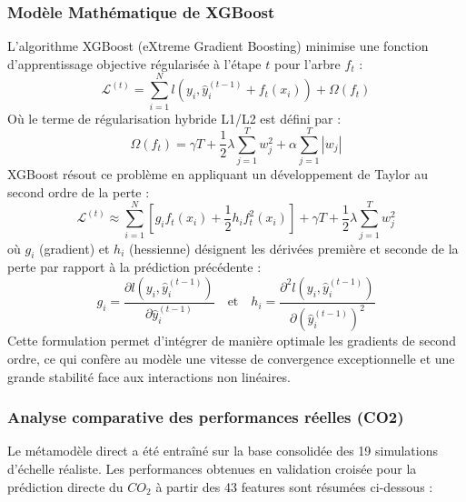 \documentclass[10pt, a4paper]{article}
\begin{document}
\subsubsection{Modèle Mathématique de
XGBoost}\label{moduxe8le-mathuxe9matique-de-xgboost}

L'algorithme XGBoost (eXtreme Gradient Boosting) minimise une fonction
d'apprentissage objective régularisée à l'étape \(t\) pour l'arbre
\(f_t\) :
\[\mathcal{L}^{(t)} = \sum_{i=1}^N l\left(y_i, \hat{y}_i^{(t-1)} + f_t(x_i)\right) + \Omega(f_t)\]
Où le terme de régularisation hybride L1/L2 est défini par :
\[\Omega(f_t) = \gamma T + \frac{1}{2} \lambda \sum_{j=1}^T w_j^2 + \alpha \sum_{j=1}^T |w_j|\]
XGBoost résout ce problème en appliquant un développement de Taylor au
second ordre de la perte :
\[\mathcal{L}^{(t)} \approx \sum_{i=1}^N \left[ g_i f_t(x_i) + \frac{1}{2} h_i f_t^2(x_i) \right] + \gamma T + \frac{1}{2} \lambda \sum_{j=1}^T w_j^2\]
où \(g_i\) (gradient) et \(h_i\) (hessienne) désignent les dérivées
première et seconde de la perte par rapport à la prédiction précédente :
\[g_i = \frac{\partial l\left(y_i, \hat{y}_i^{(t-1)}\right)}{\partial \hat{y}_i^{(t-1)}} \quad \text{et} \quad h_i = \frac{\partial^2 l\left(y_i, \hat{y}_i^{(t-1)}\right)}{\partial \left(\hat{y}_i^{(t-1)}\right)^2}\]
Cette formulation permet d'intégrer de manière optimale les gradients de
second ordre, ce qui confère au modèle une vitesse de convergence
exceptionnelle et une grande stabilité face aux interactions non
linéaires.

\subsubsection{Analyse comparative des performances réelles
(CO2)}\label{analyse-comparative-des-performances-ruxe9elles-co2}

Le métamodèle direct a été entraîné sur la base consolidée des 19
simulations d'échelle réaliste. Les performances obtenues en validation
croisée pour la prédiction directe du \(CO_2\) à partir des 43 features
sont résumées ci-dessous :
\end{document}
